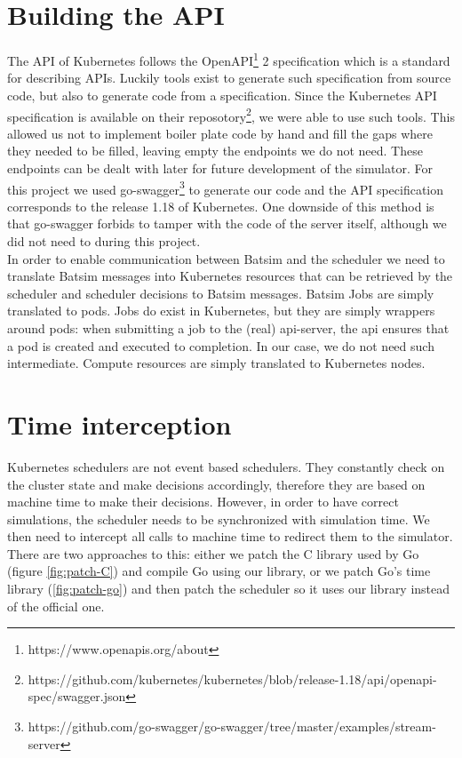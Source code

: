\section{Building the API} \label{sec:api}

The API of Kubernetes follows the
OpenAPI\footnote{https://www.openapis.org/about} 2 specification which is a
standard for describing APIs. Luckily tools exist to generate such
specification from source code, but also to generate code from a specification.
Since the Kubernetes API specification is available on their
reposotory\footnote{https://github.com/kubernetes/kubernetes/blob/release-1.18/api/openapi-spec/swagger.json},
we were able to use such tools. This allowed us not to implement boiler plate
code by hand and fill the gaps where they needed to be filled, leaving empty
the endpoints we do not need. These endpoints can be dealt with later for
future development of the simulator. For this project we used
go-swagger\footnote{https://github.com/go-swagger/go-swagger/tree/master/examples/stream-server}
to generate our code and the API specification corresponds to the release 1.18
of Kubernetes. One downside of this method is that go-swagger forbids to tamper
with the code of the server itself, although we did not need to during this
project.\\

In order to enable communication between Batsim and the scheduler we need to
translate Batsim messages into Kubernetes resources that can be retrieved by
the scheduler and scheduler decisions to Batsim messages. Batsim Jobs are
simply translated to pods. Jobs do exist in Kubernetes, but they are simply
wrappers around pods: when submitting a job to the (real) api-server, the api
ensures that a pod is created and executed to completion. In our case, we do
not need such intermediate. Compute resources are simply translated to
Kubernetes nodes.

\section{Time interception} \label{sec:time-hijack}

Kubernetes schedulers are not event based schedulers. They constantly check on
the cluster state and make decisions accordingly, therefore they are based on
machine time to make their decisions. However, in order to have correct
simulations, the scheduler needs to be synchronized with simulation time. We
then need to intercept all calls to machine time to redirect them to the
simulator. There are two approaches to this: either we patch the C library used
by Go (figure \ref{fig:patch-C}) and compile Go using our library, or we patch
Go's time library (\ref{fig:patch-go}) and then patch the scheduler so it uses
our library instead of the official one.

